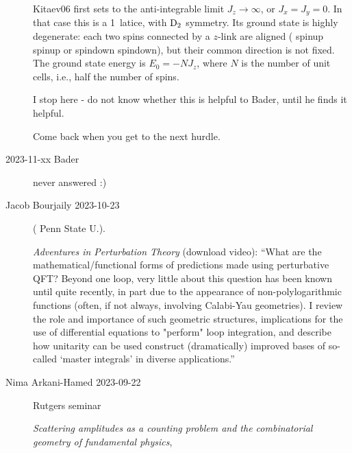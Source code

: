 \begin{description}
Kitaev06 first sets to the anti-integrable limit $J_{z}\to\infty$,
or $J_{x}=J_{y}=0$.
In that case this is a 1\dmn\ latice,
with  $\textrm{D}_{2}$ symmetry. Its ground state is highly
degenerate: each two spins connected by a $z$-link are aligned
( spinup spinup  or  spindown spindown), but their common direction is
not fixed.
The ground state energy is $E_{0}=-NJ_{z}$,
where $N$ is the number of unit cells, i.e., half the number of spins.

I stop here - do not know whether this is helpful to Bader,
until he finds it helpful.





Come back when you get to the next hurdle.

\item[2023-11-xx Bader] never answered :)



\item[Jacob Bourjaily  2023-10-23]
( {Penn State U.}).

{\em Adventures in Perturbation Theory}
{(download video)}:
``What are the mathematical/functional forms of predictions made using
perturbative QFT? Beyond one loop, very little about this question has
been known until quite recently, in part due to the appearance of
non-polylogarithmic functions (often, if not always, involving Calabi-Yau
geometries). I review the role and importance of such geometric
structures, implications for the use of differential equations to
"perform" loop integration, and describe how unitarity can be used
construct (dramatically) improved bases of so-called `master integrals'
in diverse applications.''

\item[Nima Arkani-Hamed 2023-09-22]
{Rutgers seminar}

{\em Scattering amplitudes as a counting problem and
the combinatorial geometry of fundamental physics},


\end{description}

